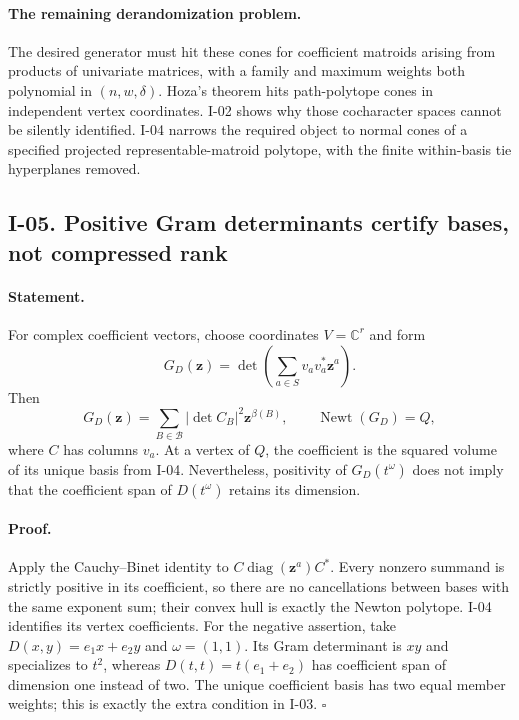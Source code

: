 \documentclass[11pt,a4paper]{article}
\theoremstyle{definition}\newtheorem{definition}{Definition}
\begin{document}
\paragraph{The remaining derandomization problem.}
The desired generator must hit these cones for coefficient matroids
arising from products of univariate matrices, with a family and
maximum weights both polynomial in $(n,w,\delta)$.  Hoza's theorem
hits path-polytope cones in independent vertex coordinates.  I-02
shows why those cocharacter spaces cannot be silently identified.
I-04 narrows the required object to normal cones of a specified
projected representable-matroid polytope, with the finite
within-basis tie hyperplanes removed.

\subsection{I-05. Positive Gram determinants certify bases, not compressed rank}
\label{I-05}

\paragraph{Statement.}
For complex coefficient vectors, choose coordinates $V=\mathbb C^r$
and form
\[
 G_D(\mathbf z)=\det\left(\sum_{a\in S}v_av_a^*\mathbf z^a\right).
\]
Then
\[
 G_D(\mathbf z)=\sum_{B\in\mathcal B}
                  |\det C_B|^2\mathbf z^{\beta(B)},
\qquad \operatorname{Newt}(G_D)=Q,
\tag{I.6}
\]
where $C$ has columns $v_a$.  At a vertex of $Q$, the coefficient
is the squared volume of its unique basis from I-04.  Nevertheless,
positivity of $G_D(t^\omega)$ does not imply that the coefficient
span of $D(t^\omega)$ retains its dimension.

\paragraph{Proof.}
Apply the Cauchy--Binet identity to
$C\operatorname{diag}(\mathbf z^a)C^*$.
Every nonzero summand is strictly positive in its coefficient, so
there are no cancellations between bases with the same exponent
sum; their convex hull is exactly the Newton polytope.  I-04
identifies its vertex coefficients.  For the negative assertion,
take $D(x,y)=e_1x+e_2y$ and $\omega=(1,1)$.  Its Gram determinant
is $xy$ and specializes to $t^2$, whereas
$D(t,t)=t(e_1+e_2)$ has coefficient span of dimension one instead
of two.  The unique coefficient basis has two equal member weights;
this is exactly the extra condition in I-03. \hfill$\square$
\end{document}
